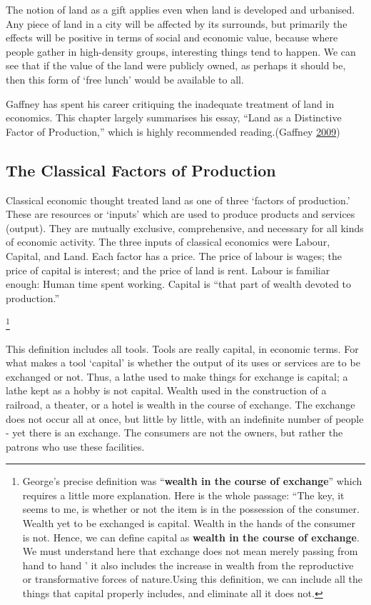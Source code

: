 \documentclass[]{tufte-handout}
\begin{document}
The notion of land as a gift applies even when land is developed and
urbanised. Any piece of land in a city will be affected by its
surrounds, but primarily the effects will be positive in terms of social
and economic value, because where people gather in high-density groups,
interesting things tend to happen. We can see that if the value of the
land were publicly owned, as perhaps it should be, then this form of
`free lunch' would be available to all.

Gaffney has spent his career critiquing the inadequate treatment of land
in economics. This chapter largely summarises his essay, ``Land as a
Distinctive Factor of Production,'' which is highly recommended
reading.(Gaffney \protect\hyperlink{ref-Gaffney2009}{2009})

\hypertarget{the-classical-factors-of-production}{%
\subsection{The Classical Factors of
Production}\label{the-classical-factors-of-production}}

Classical economic thought treated land as one of three `factors of
production.' These are resources or `inputs' which are used to produce
products and services (output). They are mutually exclusive,
comprehensive, and necessary for all kinds of economic activity. The
three inputs of classical economics were Labour, Capital, and Land. Each
factor has a price. The price of labour is wages; the price of capital
is interest; and the price of land is rent. Labour is familiar enough:
Human time spent working. Capital is ``that part of wealth devoted to
production.''

\footnote{George's precise definition was ``\textbf{wealth in the course
  of exchange}'' which requires a little more explanation. Here is the
  whole passage: ``The key, it seems to me, is whether or not the item
  is in the possession of the consumer. Wealth yet to be exchanged is
  capital. Wealth in the hands of the consumer is not. Hence, we can
  define capital as \textbf{wealth in the course of exchange}. We must
  understand here that exchange does not mean merely passing from hand
  to hand ' it also includes the increase in wealth from the
  reproductive or transformative forces of nature.Using this definition,
  we can include all the things that capital properly includes, and
  eliminate all it does not.}

This definition includes all tools. Tools are really capital, in
economic terms. For what makes a tool `capital' is whether the output of
its uses or services are to be exchanged or not. Thus, a lathe used to
make things for exchange is capital; a lathe kept as a hobby is not
capital. Wealth used in the construction of a railroad, a theater, or a
hotel is wealth in the course of exchange. The exchange does not occur
all at once, but little by little, with an indefinite number of people -
yet there is an exchange. The consumers are not the owners, but rather
the patrons who use these facilities.
\end{document}

